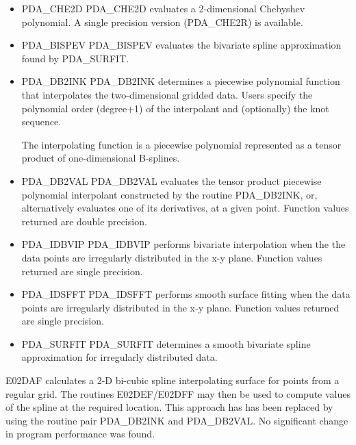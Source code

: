 \documentclass[11pt,twoside]{article}
\newcommand{\htmlref}[2]{#1}
\begin{document}
\begin{itemize}

\item \htmlref{PDA\_CHE2D}{PDA\_CHE2D}
   PDA\_CHE2D evaluates a 2-dimensional Chebyshev polynomial. A single
   precision version (PDA\_CHE2R) is available.

\item \htmlref{PDA\_BISPEV}{PDA\_BISPEV}
   PDA\_BISPEV evaluates the bivariate spline approximation found by
   PDA\_SURFIT.

\item \htmlref{PDA\_DB2INK}{PDA\_DB2INK}
   PDA\_DB2INK determines a piecewise polynomial function that
   interpolates the two-dimensional gridded data. Users specify
   the polynomial order (degree+1) of the interpolant and
   (optionally) the knot sequence.

   The interpolating  function  is  a  piecewise  polynomial
   represented as a tensor product of one-dimensional  B-splines.

\item \htmlref{PDA\_DB2VAL}{PDA\_DB2VAL}
    PDA\_DB2VAL evaluates  the  tensor product piecewise  polynomial
    interpolant constructed by the routine PDA\_DB2INK, or,
    alternatively evaluates one of its derivatives, at a given point.
    Function values returned are double precision.

\item \htmlref{PDA\_IDBVIP}{PDA\_IDBVIP}
     PDA\_IDBVIP performs bivariate interpolation when the
     the data points are irregularly distributed in the x-y plane.
     Function values returned are single precision.

\item \htmlref{PDA\_IDSFFT}{PDA\_IDSFFT}
     PDA\_IDSFFT performs smooth surface fitting when the data points
     are irregularly distributed in the x-y plane.
     Function values returned are single precision.

\item \htmlref{PDA\_SURFIT}{PDA\_SURFIT}
     PDA\_SURFIT determines a smooth bivariate spline approximation for
     irregularly distributed data.

\end{itemize}


E02DAF calculates a 2-D bi-cubic spline interpolating surface
for points from a regular grid. The routines E02DEF/E02DFF may then
be used to compute values of the spline at the required location.
This approach has has been replaced by using the routine pair PDA\_DB2INK
and PDA\_DB2VAL. No significant change in program performance
was found.
\end{document}
